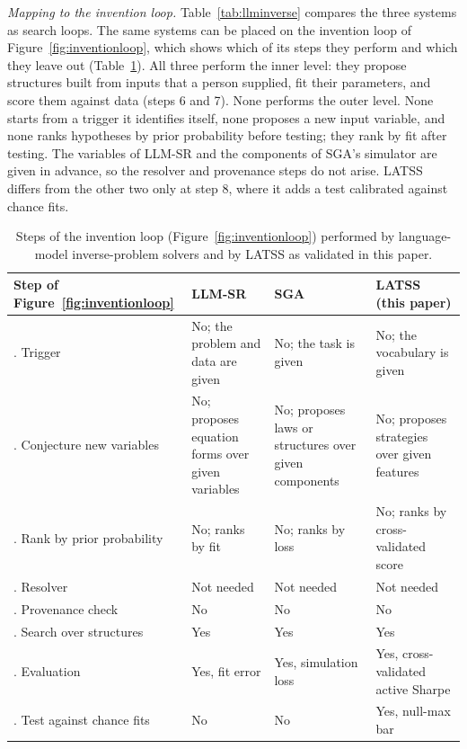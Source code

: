 \documentclass[11pt]{article}
\begin{document}
\emph{Mapping to the invention loop.} Table~\ref{tab:llminverse} compares the three systems as search
loops. The same systems can be placed on the invention loop of Figure~\ref{fig:inventionloop}, which
shows which of its steps they perform and which they leave out (Table~\ref{tab:llminverseinv}). All three
perform the inner level: they propose structures built from inputs that a person supplied, fit their
parameters, and score them against data (steps 6 and 7). None performs the outer level. None starts from
a trigger it identifies itself, none proposes a new input variable, and none ranks hypotheses by prior
probability before testing; they rank by fit after testing. The variables of LLM-SR and the components of
SGA's simulator are given in advance, so the resolver and provenance steps do not arise. LATSS differs
from the other two only at step 8, where it adds a test calibrated against chance fits.

\begin{table}[htbp]
\centering
\caption{Steps of the invention loop (Figure~\ref{fig:inventionloop}) performed by language-model
inverse-problem solvers and by LATSS as validated in this paper.}
\label{tab:llminverseinv}
\small
\begin{tabular}{>{\raggedright\arraybackslash}p{3.6cm} >{\raggedright\arraybackslash}p{3.2cm}
>{\raggedright\arraybackslash}p{3.2cm} >{\raggedright\arraybackslash}p{3.2cm}}
\toprule
Step of Figure~\ref{fig:inventionloop} & LLM-SR~\cite{llmsr} & SGA~\cite{sga} & LATSS (this paper) \\
\midrule
1. Trigger & No; the problem and data are given & No; the task is given & No; the vocabulary is given \\
2. Conjecture new variables & No; proposes equation forms over given variables & No; proposes laws or
structures over given components & No; proposes strategies over given features \\
3. Rank by prior probability & No; ranks by fit & No; ranks by loss & No; ranks by cross-validated score \\
4. Resolver & Not needed & Not needed & Not needed \\
5. Provenance check & No & No & No \\
6. Search over structures & Yes & Yes & Yes \\
7. Evaluation & Yes, fit error & Yes, simulation loss & Yes, cross-validated active Sharpe \\
8. Test against chance fits & No & No & Yes, null-max bar \\
\bottomrule
\end{tabular}
\end{table}
\end{document}
